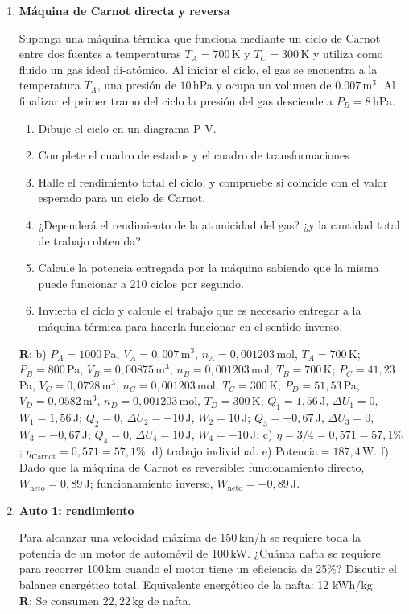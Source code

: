 \documentclass[a4paper,12pt]{article}
\begin{document}
\begin{enumerate}
	\item {\bf{Máquina de Carnot directa y reversa}}
		
		Suponga una máquina térmica que funciona mediante un ciclo de Carnot
		entre dos fuentes a temperaturas $T_A=700$\,K y $T_C=300$\,K y utiliza
		como fluido un gas ideal di-atómico. Al iniciar el ciclo, el gas se
		encuentra a la temperatura $T_A$, una presión de $10$\,hPa y ocupa un
		volumen de $0.007$\,m$^3$. Al finalizar el primer tramo del ciclo la
		presión del gas desciende a $P_B=8$\,hPa.
		\begin{enumerate}
			\item Dibuje el ciclo en un diagrama P-V.
			\item Complete el cuadro de estados y el cuadro de transformaciones
			\item Halle el rendimiento total el ciclo, y compruebe si coincide
				con el valor esperado para un ciclo de Carnot.
			\item ¿Dependerá el rendimiento de la atomicidad del gas? ¿y la
				cantidad total de trabajo obtenida?
			\item Calcule la potencia entregada por la máquina sabiendo que la
				misma puede funcionar a 210 ciclos por segundo.
			\item Invierta el ciclo y calcule el trabajo que es necesario
				entregar a la máquina térmica para hacerla funcionar en el
				sentido inverso.
		\end{enumerate}
		{\bf{R}}: 
		b)
		$P_A=1000$\,Pa, $V_A=0,007$\,m$^3$, $n_A=0,001203$\,mol, $T_A=700$\,K; 
		$P_B=800$\,Pa, $V_B=0,00875$\,m$^3$, $n_B=0,001203$\,mol, $T_B=700$\,K; 
		$P_C=41,23$\,Pa, $V_C=0,0728$\,m$^3$, $n_C=0,001203$\,mol, $T_C=300$\,K; 
		$P_D=51,53$\,Pa, $V_D=0,0582$\,m$^3$, $n_D=0,001203$\,mol, $T_D=300$\,K; 
		$Q_1=1,56$\,J, $\Delta U_1=0$, $W_1=1,56$\,J;
		$Q_2=0$, $\Delta U_2=-10$\,J, $W_2=10$\,J;
		$Q_3=-0,67$\,J, $\Delta U_3=0$, $W_3=-0,67$\,J;
		$Q_4=0$, $\Delta U_4=10$\,J, $W_4=-10$\,J;
		c)
		$\eta=3/4 = 0,571 = 57,1\%$; $\eta_{\mathrm{Carnot}} = 0,571 = 57,1\%$.
		d) trabajo individual.
		e) Potencia$=187,4$\,W.
		f) Dado que la máquina de Carnot es reversible: funcionamiento directo,
		$W_{\mathrm{neto}}=0,89$\,J; funcionamiento inverso, $W_{\mathrm{neto}}=-0,89$\,J.
	
	\item {\bf{Auto 1: rendimiento}}\label{auto1}
		
		Para alcanzar una velocidad máxima de 150\,km/h se requiere toda la
		potencia de un motor de automóvil de 100\,kW. ¿Cuánta nafta se requiere
		para recorrer 100\,km cuando el motor tiene un eficiencia de 25\%?
		Discutir el balance energético total. Equivalente energético de la
		nafta: 12 kWh/kg.
		\\{\bf{R}}: Se consumen $22,22$\,kg de nafta.
	

\end{enumerate}
\end{document}
